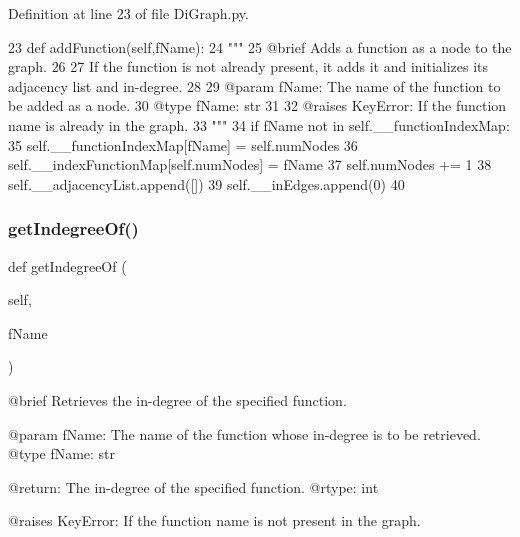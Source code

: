 Definition at line 23 of file Di\+Graph.\+py.


\begin{DoxyCode}
23     \textcolor{keyword}{def }addFunction(self,fName):
24         \textcolor{stringliteral}{"""
}
25 \textcolor{stringliteral}{        @brief Adds a function as a node to the graph.
}
26 \textcolor{stringliteral}{
}
27 \textcolor{stringliteral}{        If the function is not already present, it adds it and initializes its adjacency list and
       in-degree.
}
28 \textcolor{stringliteral}{
}
29 \textcolor{stringliteral}{        @param fName: The name of the function to be added as a node.
}
30 \textcolor{stringliteral}{        @type fName: str
}
31 \textcolor{stringliteral}{
}
32 \textcolor{stringliteral}{        @raises KeyError: If the function name is already in the graph.
}
33 \textcolor{stringliteral}{        """}
34         \textcolor{keywordflow}{if} fName \textcolor{keywordflow}{not} \textcolor{keywordflow}{in} self.\_\_functionIndexMap:
35             self.\_\_functionIndexMap[fName] = self.numNodes
36             self.\_\_indexFunctionMap[self.numNodes] = fName
37             self.numNodes += 1
38             self.\_\_adjacencyList.append([])
39             self.\_\_inEdges.append(0)
40     
\end{DoxyCode}
\mbox{\label{classDiGraph_1_1DiGraph_a02f36c0ebca9e0e4fab9591c7d43130b}} 
\subsubsection{\texorpdfstring{get\+Indegree\+Of()}{getIndegreeOf()}}
{\footnotesize\ttfamily def get\+Indegree\+Of (\begin{DoxyParamCaption}\item[{}]{self,  }\item[{}]{f\+Name }\end{DoxyParamCaption})}

\begin{DoxyVerb}@brief Retrieves the in-degree of the specified function.

@param fName: The name of the function whose in-degree is to be retrieved.
@type fName: str

@return: The in-degree of the specified function.
@rtype: int

@raises KeyError: If the function name is not present in the graph.
\end{DoxyVerb}
 

